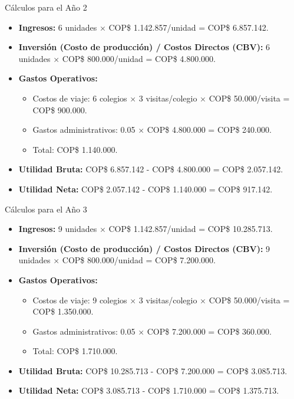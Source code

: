 \begin{frame}{Cálculos para el Año 2}
    \begin{itemize}
        \item \textbf{Ingresos:} 6 unidades $\times$ COP\$ 1.142.857/unidad = 
					COP\$ 6.857.142. 
        \item \textbf{Inversión (Costo de producción) / Costos Directos (CBV):} 
					6 unidades $\times$ COP\$ 800.000/unidad = COP\$ 4.800.000. 
        \item \textbf{Gastos Operativos:}
        \begin{itemize}
            \item Costos de viaje: 6 colegios $\times$ 3 visitas/colegio 
							$\times$ COP\$ 50.000/visita = COP\$ 900.000. 
            \item Gastos administrativos: 0.05 $\times$ COP\$ 4.800.000 = 
							COP\$ 240.000. 
            \item Total: COP\$ 1.140.000. 
        \end{itemize}
        \item \textbf{Utilidad Bruta:} COP\$ 6.857.142 - COP\$ 4.800.000 = COP\$ 2.057.142. 
        \item \textbf{Utilidad Neta:} COP\$ 2.057.142 - COP\$ 1.140.000 = COP\$ 917.142. 
    \end{itemize}
\end{frame}

\begin{frame}{Cálculos para el Año 3}
    \begin{itemize}
        \item \textbf{Ingresos:} 9 unidades $\times$ COP\$ 1.142.857/unidad = 
					COP\$ 10.285.713. 
        \item \textbf{Inversión (Costo de producción) / Costos Directos (CBV):} 
					9 unidades $\times$ COP\$ 800.000/unidad = COP\$ 7.200.000. 
        \item \textbf{Gastos Operativos:}
        \begin{itemize}
            \item Costos de viaje: 9 colegios $\times$ 3 visitas/colegio 
							$\times$ COP\$ 50.000/visita = COP\$ 1.350.000. 
            \item Gastos administrativos: 0.05 $\times$ COP\$ 7.200.000 = 
							COP\$ 360.000. 
            \item Total: COP\$ 1.710.000. 
        \end{itemize}
        \item \textbf{Utilidad Bruta:} COP\$ 10.285.713 - COP\$ 7.200.000 = COP\$ 3.085.713. 
        \item \textbf{Utilidad Neta:} COP\$ 3.085.713 - COP\$ 1.710.000 = COP\$ 1.375.713. 
    \end{itemize}
\end{frame}

